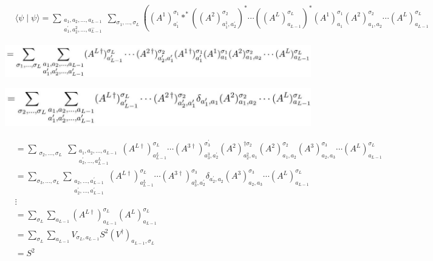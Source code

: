 \documentclass[12pt]{article}
\begin{document}
$$
\begin{aligned}
& \langle\psi \mid \psi\rangle=\sum_{\substack{a_{1}, a_{2}, \ldots, a_{L-1} \\
a_{1}^{\prime}, a_{2}^{2}, \ldots, a_{L-1}^{-}}} \sum_{\sigma_{1}, \ldots, \sigma_{L}}\left(\left(A^{1}\right)_{a_{1}^{\prime}}^{\sigma_{1}} *^{*}\left(\left(A^{2}\right)_{a_{1}^{1}, a_{2}^{\prime}}^{\sigma_{2}}\right)^{*} \cdots\left(\left(A^{L}\right)_{a_{L-1}}^{\sigma_{L}}\right)^{*}\left(A^{1}\right)_{a_{1}}^{\sigma_{1}}\left(A^{2}\right)_{a_{1}, a_{2}}^{\sigma_{2}} \cdots\left(A^{L}\right)_{a_{L-1}}^{\sigma_{L}}\right.
\end{aligned}
$$

\begin{center}
\includegraphics[max width=\textwidth]{2024_05_17_c251ec82fd3768475949g-03(1)}
\end{center}

\begin{center}
\includegraphics[max width=\textwidth]{2024_05_17_c251ec82fd3768475949g-03}
\end{center}


\begin{align*}
& =\sum_{\substack{\sigma_{2}, \ldots, \sigma_{L}}} \sum_{\substack{a_{1}, a_{2}, \ldots, a_{L-1} \\
a_{2}^{\prime}, \ldots, a_{L-1}^{L}}}\left(A^{L \dagger}\right)_{a_{L-1}^{L}}^{\sigma_{L}} \cdots\left(A^{3 \dagger}\right)_{a_{3}^{3}, a_{2}^{\prime}}^{\sigma_{3}^{\prime}}\left(A^{2}\right)_{a_{2}^{2}, a_{1}}^{\dagger \sigma_{2}}\left(A^{2}\right)_{a_{1}, a_{2}}^{\sigma_{2}}\left(A^{3}\right)_{a_{2}, a_{3}}^{\sigma_{3}} \cdots\left(A^{L}\right)_{a_{L-1}}^{\sigma_{L}} \\
& =\sum_{\sigma_{3}, \ldots, \sigma_{L}} \sum_{\substack{a_{2}, \ldots, a_{L-1}^{\prime} \\
a_{2}^{\prime}, \ldots, a_{L-1}^{\prime}}}\left(A^{L \dagger}\right)_{a_{L-1}^{L}}^{\sigma_{L}} \cdots\left(A^{3 \dagger}\right)_{a_{3}^{3}, a_{2}^{\prime}}^{\sigma_{3}} \delta_{a_{2}^{\prime}, a_{2}}\left(A^{3}\right)_{a_{2}, a_{3}}^{\sigma_{3}} \cdots\left(A^{L}\right)_{a_{L-1}}^{\sigma_{L}} \\
& \vdots \\
& =\sum_{\sigma_{L}} \sum_{a_{L-1}}\left(A^{L \dagger}\right)_{a_{L-1}}^{\sigma_{L}}\left(A^{L}\right)_{a_{L-1}}^{\sigma_{L}} \\
& =\sum_{\sigma_{L}} \sum_{a_{L-1}} V_{\sigma_{L}, a_{L-1}} S^{2}\left(V^{\dagger}\right)_{a_{L-1}, \sigma_{L}} \\
& =S^{2} \tag{6}
\end{align*}
\end{document}
